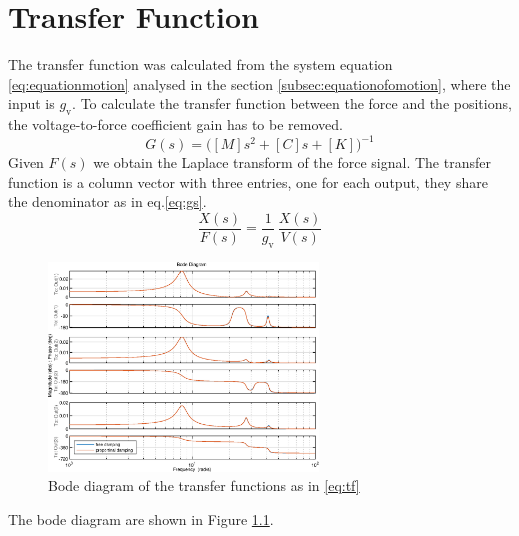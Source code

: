\chapter{Transfer Function}
\label{chap:tf}
The transfer function was calculated from the system equation
\eqref{eq:equationmotion} analysed in the section
\ref{subsec:equationofomotion}, where the input is \(g_{\text{v}}\).
To calculate the transfer function between the force and the positions, the 
voltage-to-force coefficient gain has to be removed.
%
\begin{equation}
\label{eq:gs}
	G(s) = \big([M]s^2+[C]s+[K]\big)^{-1}
\end{equation}
%
Given \(F(s)\) we obtain the Laplace transform of the force signal.
The transfer function is a column vector with three entries, one for each output,
they share the denominator as in eq.\eqref{eq:gs}.
%
\begin{equation}
\label{eq:tf}
	\frac{X(s)}{F(s)} = \frac{1}{g_{\text{v}}}\,\frac{X(s)}{V(s)}
\end{equation}
%
\begin{figure}[htb]
	\centering
	\includegraphics[width=0.64\textwidth]{bodediagram1}
	\caption{Bode diagram of the transfer functions as in \eqref{eq:tf}}
	\label{fig:bodeplot1}
\end{figure}
%
The bode diagram are shown in Figure \ref{fig:bodeplot1}.